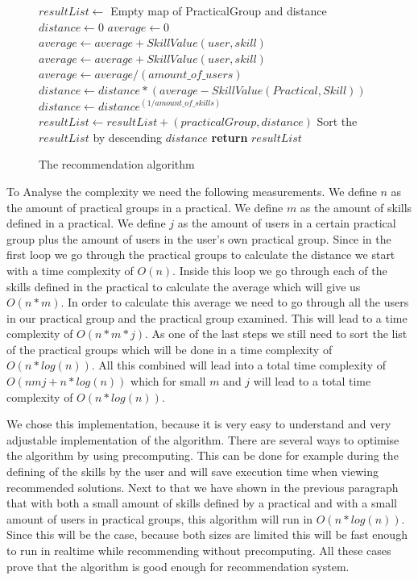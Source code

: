 \begin{figure}[H]
 \centering
\begin{algorithmic}
	\State $resultList\gets$ Empty map of PracticalGroup and distance
		\State $distance\gets 0$
			\State $average\gets 0$
				\State $average\gets average + SkillValue(user, skill)$
			\EndFor
				\State $average\gets average + SkillValue(user, skill)$
			\EndFor
			\State $average\gets average / (amount\_of\_users)$
			\State $distance\gets distance * (average - SkillValue(Practical, Skill))$
		\EndFor
		\State $distance\gets distance ^ {(1 / amount\_of\_skills)}$
		\State $resultList\gets resultList + (practicalGroup, distance)$
	\EndFor
	\State Sort the $resultList$ by descending $distance$
	\State \textbf{return} $resultList$
\EndFunction
\caption{The recommendation algorithm}\label{recommend}
\end{algorithmic}
\end{figure}

To Analyse the complexity we need the following measurements.
We define $n$ as the amount of practical groups in a practical.
We define $m$ as the amount of skills defined in a practical.
We define $j$ as the amount of users in a certain practical group plus the amount of users in the user's own practical group.
Since in the first loop we go through the practical groups to calculate the distance we start with a time complexity of $O(n)$.
Inside this loop we go through each of the skills defined in the practical to calculate the average which will give us $O(n*m)$.
In order to calculate this average we need to go through all the users in our practical group and the practical group examined.
This will lead to a time complexity of $O(n*m*j)$.
As one of the last steps we still need to sort the list of the practical groups which will be done in a time complexity of $O(n*log(n))$.
All this combined will lead into a total time complexity of $O(nmj+n*log(n))$ which for small $m$ and $j$ will lead to a total time complexity of $O(n*log(n))$.

We chose this implementation, because it is very easy to understand and very adjustable implementation of the algorithm.
There are several ways to optimise the algorithm by using precomputing.
This can be done for example during the defining of the skills by the user and will save execution time when viewing recommended solutions.
Next to that we have shown in the previous paragraph that with both a small amount of skills defined by a practical and with a small amount of users in practical groups, this algorithm will run in $O(n*log(n))$.
Since this will be the case, because both sizes are limited this will be fast enough to run in realtime while recommending without precomputing.
All these cases prove that the algorithm is good enough for recommendation system.



